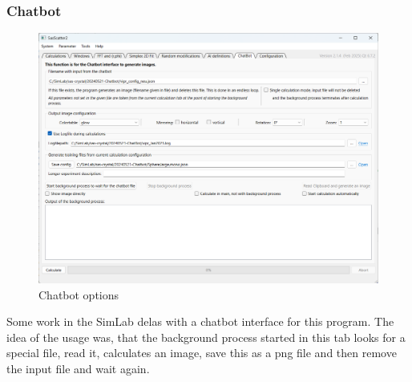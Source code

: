 \documentclass[11pt]{article} %
\begin{document}
\subsubsection{Chatbot}
\begin{figure}[H]
 \centering
 \includegraphics[width=\textwidth]{gui-chatbot.png}
 \caption{Chatbot options}
\end{figure}

Some work in the SimLab delas with a chatbot interface for this program. The idea of the usage was, that the background process started in this tab looks for a special file, read it, calculates an image, save this as a png file and then remove the input file and wait again.
\end{document}

